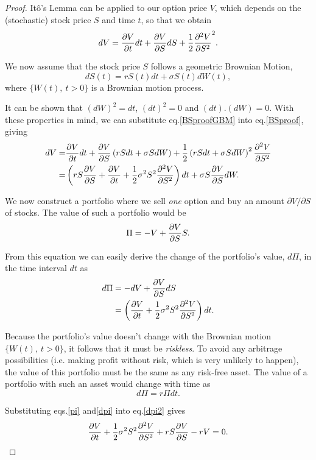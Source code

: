 \begin{proof}
Itô's Lemma can be applied to our option price $V$, which depends on the (stochastic) stock price $S$ and time $t$, so that we obtain
\begin{equation}\label{BSproof}
dV=\pdv{V}{t}dt+\pdv{V}{S}dS+\frac{1}{2}\pdv{^2V}{S^2} (dS)^2.
\end{equation}

We now assume that the stock price $S$ follows a geometric Brownian Motion,
\begin{equation}\label{BSproofGBM}
dS(t)=rS(t)dt+\sigma S(t)dW(t),
\end{equation}
\noindent where $\{W(t),\ t>0\}$ is a Brownian motion process.

It can be shown that $(dW)^2=dt$, $(dt)^2=0$ and $(dt).(dW)=0$. With these properties in mind, we can substitute eq.\eqref{BSproofGBM} into eq.\eqref{BSproof}, giving
\begin{equation}
\begin{split}
dV=&\pdv{V}{t}dt+\pdv{V}{S}\left(rSdt+\sigma SdW\right)+\frac{1}{2}\left(rSdt+\sigma SdW\right)^2\pdv{^2V}{S^2}\\
=&\left(rS\pdv{V}{S}+\pdv{V}{t}+\frac{1}{2}\sigma^2S^2\pdv{^2V}{S^2}\right)dt+\sigma S\pdv{V}{S}dW.
\end{split}
\end{equation}


We now construct a portfolio where we sell \emph{one} option and buy an amount $\partial V/\partial S$ of stocks. The value of such a portfolio would be
\begin{equation}\label{pi}
\Pi=-V+\pdv{V}{S}S.
\end{equation}

From this equation we can easily derive the change of the portfolio's value, $d\Pi$, in the time interval $dt$ as
\begin{equation}\label{dpi}
\begin{split}
d\Pi&=-dV+\pdv{V}{S}dS\\
&=\left(\pdv{V}{t}+\frac{1}{2}\sigma^2S^2\pdv{^2V}{S^2}\right)dt.
\end{split}
\end{equation}

Because the portfolio's value doesn't change with the Brownian motion $\{W(t),\ t>0\}$, it follows that it must be \emph{riskless}.
To avoid any arbitrage possibilities (i.e. making profit without risk, which is very unlikely to happen), the value of this portfolio must be the same as any risk-free asset. The value of a portfolio with such an asset would change with time as
\begin{equation}\label{dpi2}
d\Pi=r\Pi dt.
\end{equation}

Substituting eqs.\eqref{pi} and\eqref{dpi} into eq.\eqref{dpi2} gives
\begin{equation}
\pdv{V}{t}+\frac{1}{2}\sigma^2S^2\pdv{^2V}{S^2}+rS\pdv{V}{S}-rV=0.
\end{equation}

\end{proof}


